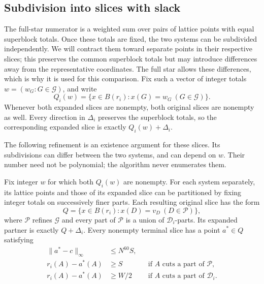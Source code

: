 \subsection{Subdivision into slices with slack}

The full-star numerator is a weighted sum over pairs of lattice
points with equal superblock totals.  Once these totals are fixed,
the two systems can be subdivided independently.  We will contract
them toward separate points in their respective slices; this
preserves the common superblock totals but may introduce differences
away from the representative coordinates.  The full star allows
these differences, which is why it is used for this comparison.
Fix such a vector of integer
totals \(w=(w_G:G\in\mathcal G)\), and write
\begin{equation}\label{eq:original-slices}
 Q_i(w)=\{x\in B(r_i):x(G)=w_G\ (G\in\mathcal G)\}.
\end{equation}
Whenever both expanded slices are nonempty, both original slices
are nonempty as well.  Every direction in \(\Delta_i\) preserves
the superblock totals, so the corresponding expanded slice is
exactly \(Q_i(w)+\Delta_i\).

The following refinement is an existence argument for these
slices.  Its subdivisions can differ between the two systems, and
can depend on \(w\).  Their number need not be polynomial; the
algorithm never enumerates them.

\begin{lemma}\label{lem:refinement-witnesses}
Fix integer \(w\) for which both \(Q_i(w)\) are nonempty.
For each system separately, its lattice points and those of its
expanded slice can be partitioned by fixing integer totals on
successively finer parts.  Each resulting original slice has the
form
\[
 Q=\{x\in B(r_i):x(D)=v_D\ (D\in\mathcal P)\},
\]
where \(\mathcal P\) refines \(\mathcal G\) and every part of
\(\mathcal P\) is a union of \(\mathcal D_i\)-parts.  Its
expanded partner is exactly \(Q+\Delta_i\).  Every nonempty
terminal slice has a point \(a^*\in Q\) satisfying
\begin{align}
 \|a^*-c\|_\infty&\le N^{60}S,
                       \label{eq:witness-distance}\\
 r_i(A)-a^*(A)&\ge S
       &&\text{if \(A\) cuts a part of \(\mathcal P\)},
                       \label{eq:witness-terminal-slack}\\
 r_i(A)-a^*(A)&\ge W/2
       &&\text{if \(A\) cuts a part of \(\mathcal D_i\)}.
                       \label{eq:witness-fine-slack}
\end{align}
\end{lemma}

